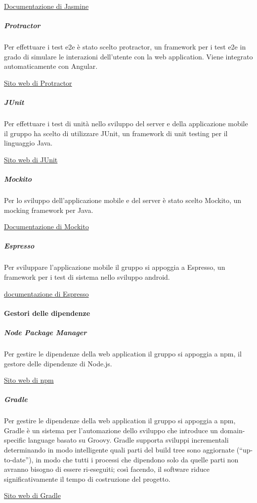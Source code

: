 \documentclass[../../norme-di-progetto.tex]{subfiles}
\begin{document}
\href{https://jasmine.github.io/}{Documentazione di Jasmine}

\subparagraph{Protractor}%
\label{subp:protractor}
Per effettuare i test e2e è stato scelto protractor, un framework per i test e2e in grado di simulare le interazioni dell'utente con la web application.
Viene integrato automaticamente con Angular.

\href{https://www.protractortest.org/}{Sito web di Protractor}

\subparagraph{JUnit}%
\label{subp:junit}
Per effettuare i test di unità nello sviluppo del server e della applicazione mobile il gruppo ha scelto di utilizzare JUnit, un framework di unit testing per il linguaggio Java.

\href{https://junit.org/junit4/}{Sito web di JUnit}

\subparagraph{Mockito}%
\label{subp:mockito}
Per lo sviluppo dell'applicazione mobile e del server è stato scelto Mockito, un mocking framework per Java.

\href{https://site.mockito.org/}{Documentazione di Mockito}

\subparagraph{Espresso}%
\label{subp:espresso}
Per sviluppare l'applicazione mobile il gruppo si appoggia a Espresso, un framework per i test di sistema nello sviluppo android.

\href{https://developer.android.com/training/testing/espresso}{documentazione di Espresso}


\paragraph{Gestori delle dipendenze}%
\label{par:gestori_dipendenze}

\subparagraph{Node Package Manager}%
\label{subp:npm}
Per gestire le dipendenze della web application il gruppo si appoggia a npm, il gestore delle dipendenze di Node.js.

\href{https://www.npmjs.com/}{Sito web di npm}

\subparagraph{Gradle}%
\label{subp:gradle}
Per gestire le dipendenze della web application il gruppo si appoggia a npm,
Gradle è un sistema per l'automazione dello sviluppo che introduce un domain-specific language basato su Groovy.
Gradle supporta sviluppi incrementali determinando in modo intelligente quali parti del build tree sono aggiornate (``up-to-date''), in modo che tutti i processi che dipendono solo da quelle parti non avranno bisogno di essere ri-eseguiti; così facendo, il software riduce significativamente il tempo di costruzione del progetto.

\href{https://gradle.org/}{Sito web di Gradle}
\end{document}
